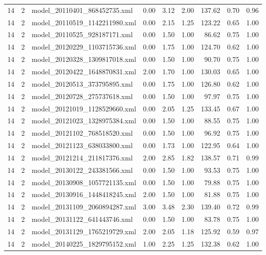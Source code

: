 \begin{table}[ht]
\begin{tabular}{rrlrrrrrr}
   14 &   2 & model\_20110401\_868452735.xml & 0.00 & 3.12 & 2.00 & 137.62 & 0.70 & 0.96 \\ 
   14 &   2 & model\_20110519\_1142211980.xml & 0.00 & 2.15 & 1.25 & 123.22 & 0.65 & 1.00 \\ 
   14 &   2 & model\_20110525\_928187171.xml & 0.00 & 1.50 & 1.00 & 86.62 & 0.75 & 1.00 \\ 
   14 &   2 & model\_20120229\_1103715736.xml & 0.00 & 1.75 & 1.00 & 124.70 & 0.62 & 1.00 \\ 
   14 &   2 & model\_20120328\_1309817018.xml & 0.00 & 1.50 & 1.00 & 90.70 & 0.75 & 1.00 \\ 
   14 &   2 & model\_20120422\_1648870831.xml & 2.00 & 1.70 & 1.00 & 130.03 & 0.65 & 1.00 \\ 
   14 &   2 & model\_20120513\_373795895.xml & 0.00 & 1.75 & 1.00 & 126.80 & 0.62 & 1.00 \\ 
   14 &   2 & model\_20120728\_275737618.xml & 0.00 & 1.50 & 1.00 & 97.97 & 0.75 & 1.00 \\ 
   14 &   2 & model\_20121019\_1128529660.xml & 0.00 & 2.05 & 1.25 & 133.45 & 0.67 & 1.00 \\ 
   14 &   2 & model\_20121023\_1328975384.xml & 0.00 & 1.50 & 1.00 & 88.55 & 0.75 & 1.00 \\ 
   14 &   2 & model\_20121102\_768518520.xml & 0.00 & 1.50 & 1.00 & 96.92 & 0.75 & 1.00 \\ 
   14 &   2 & model\_20121123\_638033800.xml & 0.00 & 1.73 & 1.00 & 122.95 & 0.64 & 1.00 \\ 
   14 &   2 & model\_20121214\_211817376.xml & 2.00 & 2.85 & 1.82 & 138.57 & 0.71 & 0.99 \\ 
   14 &   2 & model\_20130122\_243381566.xml & 0.00 & 1.50 & 1.00 & 93.53 & 0.75 & 1.00 \\ 
   14 &   2 & model\_20130908\_1057721135.xml & 0.00 & 1.50 & 1.00 & 79.88 & 0.75 & 1.00 \\ 
   14 &   2 & model\_20130916\_1448418245.xml & 2.00 & 1.50 & 1.00 & 81.88 & 0.75 & 1.00 \\ 
   14 &   2 & model\_20131109\_2060894287.xml & 3.00 & 3.48 & 2.30 & 139.40 & 0.72 & 0.99 \\ 
   14 &   2 & model\_20131122\_641443746.xml & 0.00 & 1.50 & 1.00 & 83.78 & 0.75 & 1.00 \\ 
   14 &   2 & model\_20131129\_1765219729.xml & 2.00 & 2.05 & 1.18 & 125.92 & 0.59 & 0.97 \\ 
   14 &   2 & model\_20140225\_1829795152.xml & 1.00 & 2.25 & 1.25 & 132.38 & 0.62 & 1.00 \\ 

\end{tabular}
\end{table}
